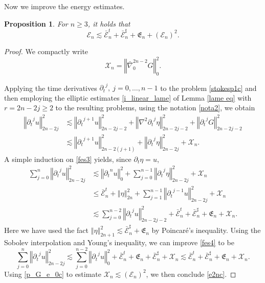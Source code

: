 \documentclass[a4paper,reqno,11pt]{amsart}
\numberwithin{equation}{section}
\providecommand{\norm}[1]{\left\Vert#1\right\Vert}
\providecommand{\se}[1]{\mathcal{E}_{#1}}
\providecommand{\ns}[1]{\norm{#1}^2}
\providecommand{\norm}[1]{\left\Vert#1\right\Vert}
\newtheorem{prop}[lem]{Proposition}
\begin{document}
Now we improve the energy estimates.
\begin{prop}\label{e2ncprop}
For $n\ge 3$, it holds that
\begin{equation}\label{e2nc}
{\mathcal{E}}_{n}  \lesssim
\bar{\mathcal{E}}_n^t  +\bar{\mathcal{E}}_n^\sharp  +\mathfrak{E}_n + (\mathcal{E}_{n} )^{2}.
\end{equation}
\end{prop}
\begin{proof}
We compactly write
\begin{equation}\label{nota2}
 \mathcal{X}_n =   \ns{ \bar{\nabla}^{2n-2}_0  G}_{0} .
\end{equation}

Applying the time derivatives ${\partial_t}^{j},\ j=0,\dots,n-1$ to the problem \eqref{stokesp1c} and then employing the elliptic estimates \eqref{i_linear_lame} of Lemma \ref{lame eq} with $r=2n-2j\ge 2$ to the resulting problems, using the notation \eqref{nota2}, we obtain
\begin{equation}\label{fes3}
\begin{split}
 \norm{{\partial_t}^j  u  }_{2n-2j}^2 & {\lesssim}
\norm{ {\partial_t}^{j+1} u   }_{2n-2j-2 }^2+\norm{ \nabla^2 {\partial_t}^{j} \eta}_{2n-2j-2 }^2+ \norm{ {\partial_t}^j G   }_{2n-2j-2}^2
  \\&{\lesssim}   \norm{{\partial_t}^{j+1} u   }_{2n-2(j+1) }^2 +\norm{   {\partial_t}^{j} \eta}_{2n-2j  }^2  + \mathcal{X}_n.
\end{split}
\end{equation}
A simple induction on \eqref{fes3} yields, since ${\partial_t}\eta=u$,
\begin{equation}\label{fes4}
\begin{split}
\sum_{j=0}^{n}\norm{ {\partial_t}^j u  }_{2n-2j }^2
 &  {\lesssim} \ns{{\partial_t}^{n} u}_{0} +\sum_{j=0}^{n-1}\norm{ {\partial_t}^j \eta  }_{2n-2j }^2  +\mathcal{X}_n
\\&   \le \bar{\mathcal{E}}_n^t +\norm{  \eta  }_{2n  }^2 +\sum_{j=1}^{n-1}\norm{ {\partial_t}^{j-1} u  }_{2n-2j }^2    +\mathcal{X}_n
\\&  {\lesssim}  \sum_{j=0}^{n-2}\norm{ {\partial_t}^{j} u  }_{2n-2j-2}^2     +\bar{\mathcal{E}}_n^t  + \bar{\mathcal{E}}_n^\sharp  +\mathfrak{E}_n  + \mathcal{X}_n.
\end{split}
\end{equation}
Here we have used the fact $\norm{  \eta  }_{2n+1}^2{\lesssim} \bar{\mathcal{E}}_n^\sharp  +\mathfrak{E}_n$ by Poincar\'e's inequality.
Using the Sobolev interpolation and Young's inequality, we can improve \eqref{fes4} to be
\begin{equation}
  \sum_{j=0}^{n}\norm{ {\partial_t}^j u  }_{2n-2j }^2
 {\lesssim}  \sum_{j=0}^{n-2}\norm{ {\partial_t}^{j} u  }_{0}^2   + \bar{\mathcal{E}}_n^t +\mathfrak{E}_n + \bar{\mathcal{E}}_n^\sharp  + \mathcal{X}_n
{\lesssim}   \bar{\mathcal{E}}_n^t +\bar{\mathcal{E}}_n^\sharp  +\mathfrak{E}_n +  \mathcal{X}_n.
 \end{equation}
Using \eqref{p_G_e_0c} to estimate $\mathcal{X}_n{\lesssim} ({ \se{n}  })^2$, we then conclude \eqref{e2nc}.
\end{proof}
\end{document}
